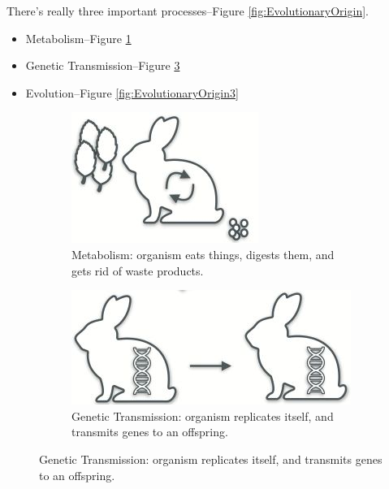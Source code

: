 \documentclass[]{article}
\begin{document}
There's really three important processes--Figure \ref{fig:EvolutionaryOrigin}.

\begin{itemize}
	\item Metabolism--Figure \ref{fig:EvolutionaryOrigin1}
	\item Genetic Transmission--Figure \ref{fig:EvolutionaryOrigin2}
	\item Evolution--Figure \ref{fig:EvolutionaryOrigin3}
\end{itemize}

\begin{figure}[H]
	\caption{Evolutionary origin of three processes}\label{fig:EvolutionaryOrigin}
	\begin{subfigure}[t]{0.3\textwidth}
		\caption{Metabolism: organism eats things, digests them, and gets rid of waste products.}\label{fig:EvolutionaryOrigin1}
		\includegraphics[width=\textwidth]{EvolutionaryOrigin1}
	\end{subfigure}
	\;\;
	\begin{subfigure}[t]{0.3\textwidth}
		\caption{Genetic Transmission: organism replicates itself, and transmits genes to an offspring.}\label{fig:EvolutionaryOrigin2}
		\includegraphics[width=\textwidth]{EvolutionaryOrigin2}

\end{subfigure}
\end{figure}
\end{document}
